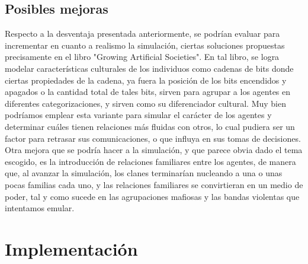 \documentclass[11pt]{article}
\begin{document}
\subsection{Posibles mejoras}
Respecto a la desventaja presentada anteriormente, se podrían evaluar para incrementar en cuanto a realismo la simulación, ciertas soluciones propuestas precisamente en el libro "Growing Artificial Societies". En tal libro, se logra modelar características culturales de los individuos como cadenas de bits donde ciertas propiedades de la cadena, ya fuera la posición de los bits encendidos y apagados o la cantidad total de tales bits, sirven para agrupar a los agentes en diferentes categorizaciones, y sirven como su diferenciador cultural. Muy bien podríamos emplear esta variante para simular el carácter de los agentes y determinar cuáles tienen relaciones más fluidas con otros, lo cual pudiera ser un factor para retrasar sus comunicaciones, o que influya en sus tomas de decisiones.\\
Otra mejora que se podría hacer a la simulación, y que parece obvia dado el tema escogido, es la introducción de relaciones familiares entre los agentes, de manera que, al avanzar la simulación, los clanes terminarían nucleando a una o unas pocas familias cada uno, y las relaciones familiares se convirtieran en un medio de poder, tal y como sucede en las agrupaciones mafiosas y las bandas violentas que intentamos emular.\\

\section{Implementación}
\end{document}
